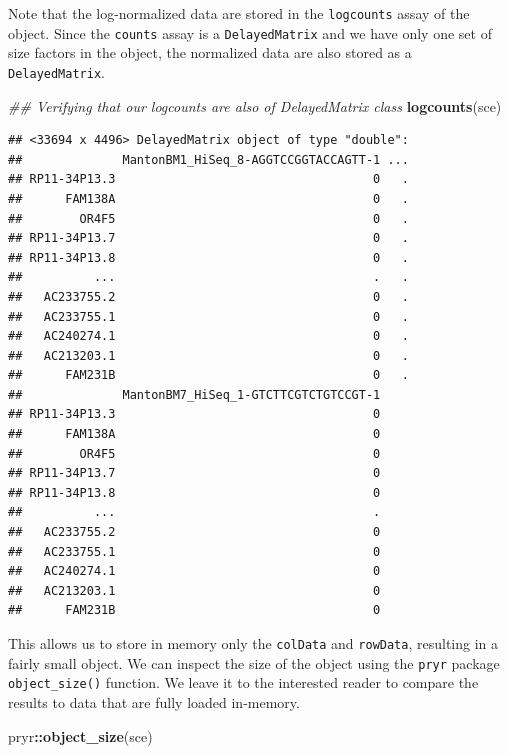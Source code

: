 \documentclass[]{book}
\newenvironment{Shaded}{\begin{snugshade}}{\end{snugshade}}
\newcommand{\CommentTok}[1]{\textcolor[rgb]{0.56,0.35,0.01}{\textit{#1}}}
\newcommand{\KeywordTok}[1]{\textcolor[rgb]{0.13,0.29,0.53}{\textbf{#1}}}
\newcommand{\NormalTok}[1]{#1}
\newcommand{\OperatorTok}[1]{\textcolor[rgb]{0.81,0.36,0.00}{\textbf{#1}}}
\begin{document}
Note that the log-normalized data are stored in the \texttt{logcounts} assay of the object. Since the \texttt{counts} assay is a \texttt{DelayedMatrix} and we have only one set of size factors in the object, the normalized data are also stored as a \texttt{DelayedMatrix}.

\begin{Shaded}
\begin{Highlighting}[]
\CommentTok{## Verifying that our logcounts are also of DelayedMatrix class}
\KeywordTok{logcounts}\NormalTok{(sce)}
\end{Highlighting}
\end{Shaded}

\begin{verbatim}
## <33694 x 4496> DelayedMatrix object of type "double":
##              MantonBM1_HiSeq_8-AGGTCCGGTACCAGTT-1 ...
## RP11-34P13.3                                    0   .
##      FAM138A                                    0   .
##        OR4F5                                    0   .
## RP11-34P13.7                                    0   .
## RP11-34P13.8                                    0   .
##          ...                                    .   .
##   AC233755.2                                    0   .
##   AC233755.1                                    0   .
##   AC240274.1                                    0   .
##   AC213203.1                                    0   .
##      FAM231B                                    0   .
##              MantonBM7_HiSeq_1-GTCTTCGTCTGTCCGT-1
## RP11-34P13.3                                    0
##      FAM138A                                    0
##        OR4F5                                    0
## RP11-34P13.7                                    0
## RP11-34P13.8                                    0
##          ...                                    .
##   AC233755.2                                    0
##   AC233755.1                                    0
##   AC240274.1                                    0
##   AC213203.1                                    0
##      FAM231B                                    0
\end{verbatim}

This allows us to store in memory only the \texttt{colData} and \texttt{rowData}, resulting in a fairly small object. We can inspect the size of the object using the \texttt{pryr} package \texttt{object\_size()} function. We leave it to the interested reader to compare the results to data that are fully loaded in-memory.

\begin{Shaded}
\begin{Highlighting}[]
\NormalTok{pryr}\OperatorTok{::}\KeywordTok{object_size}\NormalTok{(sce)}
\end{Highlighting}
\end{Shaded}
\end{document}

